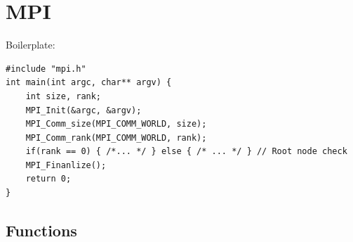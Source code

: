 \section{MPI}

Boilerplate: 
\begin{verbatim}
#include "mpi.h"
int main(int argc, char** argv) {
    int size, rank;
    MPI_Init(&argc, &argv);
    MPI_Comm_size(MPI_COMM_WORLD, size);
    MPI_Comm_rank(MPI_COMM_WORLD, rank);
    if(rank == 0) { /*... */ } else { /* ... */ } // Root node check
    MPI_Finanlize();
    return 0;
}
\end{verbatim}

\subsection{Functions}

